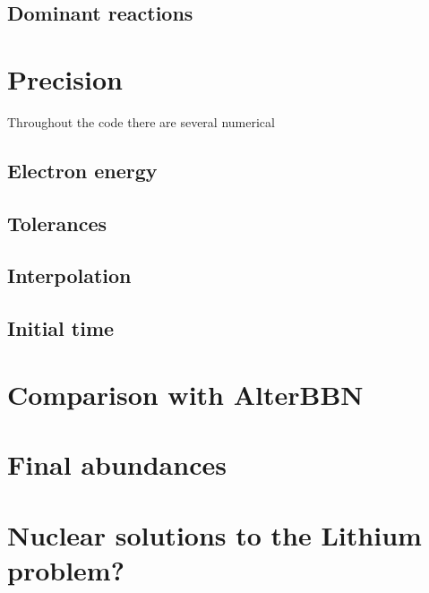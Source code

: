\subsection{Dominant reactions}





\section{Precision}
Throughout the code there are several numerical 



\subsection{Electron energy}

\subsection{Tolerances}

\subsection{Interpolation}

\subsection{Initial time}

\subsection{}


\section{Comparison with AlterBBN}
\label{sec:Altercompare}



\section{Final abundances}

\section{Nuclear solutions to the Lithium problem?}